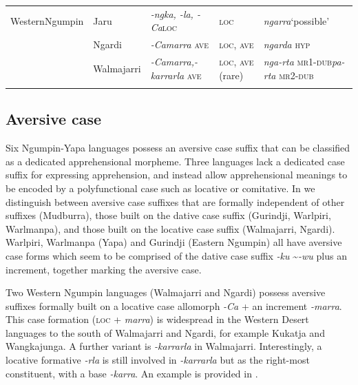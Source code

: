 \documentclass[output=paper,colorlinks,citecolor=brown]{langscibook}
\begin{document}
\begin{table}
\begin{tabularx}{\textwidth}{p{1.5cm}lQQQ}
 \midrule
Western\newline Ngumpin & Jaru & \textit{-ngka, -la, -Ca}\newline \textsc{loc}   & \textsc{loc} & \textit{ngarra}\newline `possible'   \\
\tablevspace
 & Ngardi & \textit{-Camarra} \textsc{ave} & \textsc{loc}, \textsc{ave} & \textit{ngarda} \textsc{hyp} \\
\tablevspace
 & Walmajarri & \textit{-Camarra,}\newline \textit{-karrarla} \textsc{ave}   & \textsc{loc}, \textsc{ave} (rare) & \textit{nga-rta} \textsc{mr1-dub}\newline  \textit{pa-rta} \textsc{mr2-dub}   \\
\lspbottomrule
\end{tabularx}
\end{table}



\subsection{Aversive case}
\label{subsec:aversivecase}

Six Ngumpin-Yapa languages possess an aversive case suffix that can be classified as a dedicated apprehensional morpheme. Three languages lack a dedicated case suffix for expressing apprehension, and instead allow apprehensional meanings to be encoded by a polyfunctional case such as locative or comitative. In  we distinguish between aversive case suffixes that are formally independent of other suffixes (Mudburra), those built on the dative case suffix (Gurindji, Warlpiri, Warlmanpa), and those built on the locative case suffix (Walmajarri, Ngardi). Warlpiri, Warlmanpa (Yapa) and Gurindji (Eastern Ngumpin) all have aversive case forms which seem to be comprised of the dative case suffix \textit{-ku} \textasciitilde \textit{-wu} plus an increment, together marking the aversive case. 

\largerpage
Two Western Ngumpin languages (Walmajarri and Ngardi) possess aversive suffixes formally built on a locative case allomorph \textit{-Ca} + an increment \textit{-marra}. This case formation (\textsc{loc} + \textit{marra}) is widespread in the Western Desert languages to the south of Walmajarri and Ngardi, for example Kukatja and Wangkajunga. A further variant is \textit{-karrarla} in Walmajarri. Interestingly, a locative formative \textit{-rla} is still involved in \textit{-karrarla} but as the right-most constituent, with a base \textit{-karra}. An example is provided in .
\end{document}
